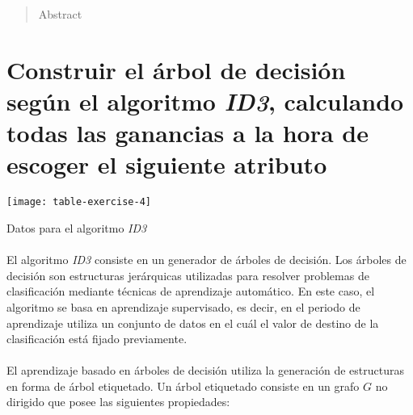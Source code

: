 \documentclass[10pt, a4paper,spanish]{article}
\begin{document}
	\maketitle %

	\thispagestyle{fancy} %



	\begin{abstract}
		\noindent Abstract
	\end{abstract}


	\setcounter{section}{4}

	\section{Construir el árbol de decisión según el algoritmo \emph{ID3}, calculando todas las ganancias a la hora de escoger el siguiente atributo}

		\begin{table}
			\begin{center}
				\texttt{[image: table-exercise-4]}
				\caption{Datos para el algoritmo \emph{ID3}}
			\end{center}
			\label{e4:table}
		\end{table}

		\paragraph{}
		El algoritmo \emph{ID3} consiste en un generador de árboles de decisión. Los árboles de decisión son estructuras jerárquicas utilizadas para resolver problemas de clasificación mediante técnicas de aprendizaje automático. En este caso, el algoritmo se basa en aprendizaje supervisado, es decir, en el periodo de aprendizaje utiliza un conjunto de datos en el cuál el valor de destino de la clasificación está fijado previamente.

		\paragraph{}
		El aprendizaje basado en árboles de decisión utiliza la generación de estructuras en forma de árbol etiquetado. Un árbol etiquetado consiste en un grafo $G$ no dirigido que posee las siguientes propiedades\cite{wiki:tree}:
\end{document}
